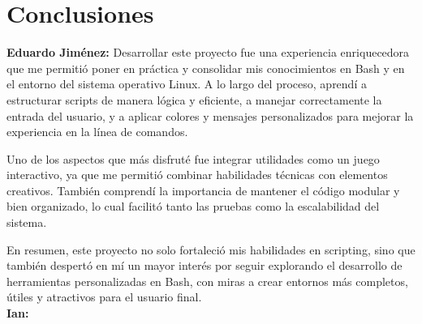 \documentclass[12pt]{article}
\begin{document}
\newpage
\section{Conclusiones}

\textbf{Eduardo Jiménez:} Desarrollar este proyecto fue una experiencia enriquecedora que me permitió poner en práctica y consolidar mis conocimientos en Bash y en el entorno del sistema operativo Linux. A lo largo del proceso, aprendí a estructurar scripts de manera lógica y eficiente, a manejar correctamente la entrada del usuario, y a aplicar colores y mensajes personalizados para mejorar la experiencia en la línea de comandos.

Uno de los aspectos que más disfruté fue integrar utilidades como un juego interactivo, ya que me permitió combinar habilidades técnicas con elementos creativos. También comprendí la importancia de mantener el código modular y bien organizado, lo cual facilitó tanto las pruebas como la escalabilidad del sistema.

En resumen, este proyecto no solo fortaleció mis habilidades en scripting, sino que también despertó en mí un mayor interés por seguir explorando el desarrollo de herramientas personalizadas en Bash, con miras a crear entornos más completos, útiles y atractivos para el usuario final.\\

\textbf{Ian:}
\end{document}
